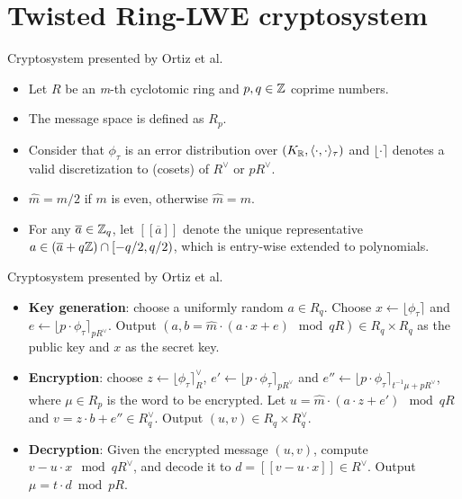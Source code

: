 \documentclass[notheorems, bigger]{beamer}
\begin{document}
\section{Twisted Ring-LWE cryptosystem}
\label{sec:org75064c7}
\begin{frame}[label={sec:org90489cd}]{Cryptosystem presented by Ortiz et al.}
\begin{itemize}
\item Let \(R\) be an \emph{m}-th cyclotomic ring and \(p, q \in \mathbb{Z}\) coprime numbers.
\item The message space is defined as \(R_p\).
\item Consider that \(\phi_\tau\) is an error distribution over \((K_{\mathbb{R}},\langle{\cdot,\cdot}\rangle_\tau)\) and \(\lfloor{\cdot}\rceil\) denotes a valid discretization to (cosets) of \(R^\vee\) or \(pR^\vee\).
\item \(\hat{m} = m/2\) if \(m\) is even, otherwise \(\hat{m} = m\).
\item For any \(\overline{a} \in \mathbb{Z}_q\), let \([[\overline{a}]]\) denote the unique representative \(a \in (\overline{a} + q\mathbb{Z}) \cap [-q/2, q/2)\), which is entry-wise extended to polynomials.
\end{itemize}
\end{frame}
\begin{frame}[label={sec:org53053ee}]{Cryptosystem presented by Ortiz et al.}
 \begin{itemize}
\item \textbf{Key generation}: choose a uniformly random $a \in R_q$. Choose $x
  \longleftarrow \lfloor{\phi_\tau}\rceil$ and $e \longleftarrow \lfloor{p \cdot \phi_\tau}\rceil_{pR^\vee}$. Output $(a,b = \hat{m}\cdot(a \cdot x + e)
  \mod{qR} ) \in R_q \times R_q$ as the public key and $x$ as the secret key.
\item \textbf{Encryption}: choose $z \longleftarrow  \lfloor{\phi_\tau}\rceil_R^\vee$, $e' \longleftarrow \lfloor{p \cdot
    \phi_\tau}\rceil_{pR^\vee}$ and  $e'' \longleftarrow \lfloor{p \cdot \phi_\tau}\rceil_{t^{-1}\mu +pR^\vee}$, where $\mu \in R_p$ is
  the word to be encrypted. Let $u = \hat{m} \cdot (a \cdot z + e') \mod{qR}$ and $v =
  z \cdot b + e'' \in R_q^\vee$. Output $(u,v) \in R_q \times R^\vee_q$.
\item \textbf{Decryption}: Given the encrypted message $(u,v)$, compute $v - u
  \cdot x \mod{qR^\vee}$, and decode it to $d = [[v - u \cdot x]] \in R^\vee$. Output $\mu = t \cdot
  d \bmod{pR}$. 
\end{itemize}
\end{frame}
\end{document}
